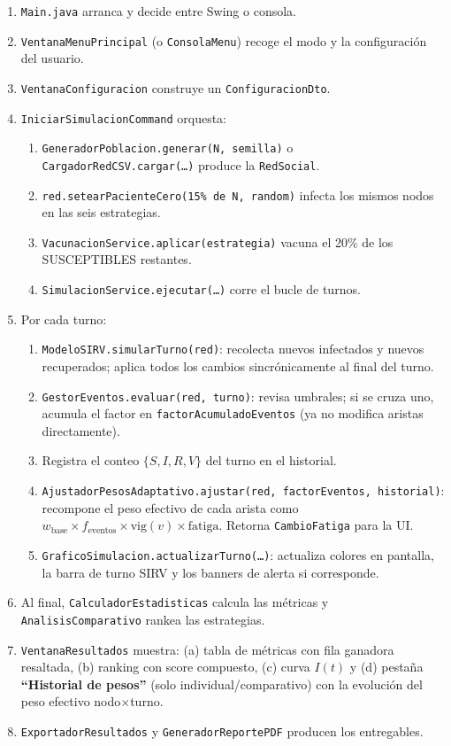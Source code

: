 \documentclass[spanish,notitlepage,letterpaper, 12pt]{article}
\begin{document}
\begin{enumerate}[leftmargin=*]
    \item \texttt{Main.java} arranca y decide entre Swing o consola.
    \item \texttt{VentanaMenuPrincipal} (o \texttt{ConsolaMenu}) recoge el modo y la configuraci\'on del usuario.
    \item \texttt{VentanaConfiguracion} construye un \texttt{ConfiguracionDto}.
    \item \texttt{IniciarSimulacionCommand} orquesta:
    \begin{enumerate}
        \item \texttt{GeneradorPoblacion.generar(N, semilla)} o \texttt{CargadorRedCSV.cargar(\ldots)} produce la \texttt{RedSocial}.
        \item \texttt{red.setearPacienteCero(15\% de N, random)} infecta los mismos nodos en las seis estrategias.
        \item \texttt{VacunacionService.aplicar(estrategia)} vacuna el 20\% de los SUSCEPTIBLES restantes.
        \item \texttt{SimulacionService.ejecutar(\ldots)} corre el bucle de turnos.
    \end{enumerate}
    \item Por cada turno:
    \begin{enumerate}
        \item \texttt{ModeloSIRV.simularTurno(red)}: recolecta nuevos infectados y nuevos recuperados; aplica todos los cambios sincr\'onicamente al final del turno.
        \item \texttt{GestorEventos.evaluar(red, turno)}: revisa umbrales; si se cruza uno, acumula el factor en \texttt{factorAcumuladoEventos} (ya no modifica aristas directamente).
        \item Registra el conteo $\{S, I, R, V\}$ del turno en el historial.
        \item \texttt{AjustadorPesosAdaptativo.ajustar(red, factorEventos, historial)}: recompone el peso efectivo de cada arista como $w_{\text{base}} \times f_{\text{eventos}} \times \mathrm{vig}(v) \times \mathrm{fatiga}$. Retorna \texttt{CambioFatiga} para la UI.
        \item \texttt{GraficoSimulacion.actualizarTurno(\ldots)}: actualiza colores en pantalla, la barra de turno SIRV y los banners de alerta si corresponde.
    \end{enumerate}
    \item Al final, \texttt{CalculadorEstadisticas} calcula las m\'etricas y \texttt{AnalisisComparativo} rankea las estrategias.
    \item \texttt{VentanaResultados} muestra: (a) tabla de m\'etricas con fila ganadora resaltada, (b) ranking con score compuesto, (c) curva $I(t)$ y (d) pesta\~na \textbf{``Historial de pesos''} (solo individual/comparativo) con la evoluci\'on del peso efectivo nodo$\times$turno.
    \item \texttt{ExportadorResultados} y \texttt{GeneradorReportePDF} producen los entregables.
\end{enumerate}
\end{document}
